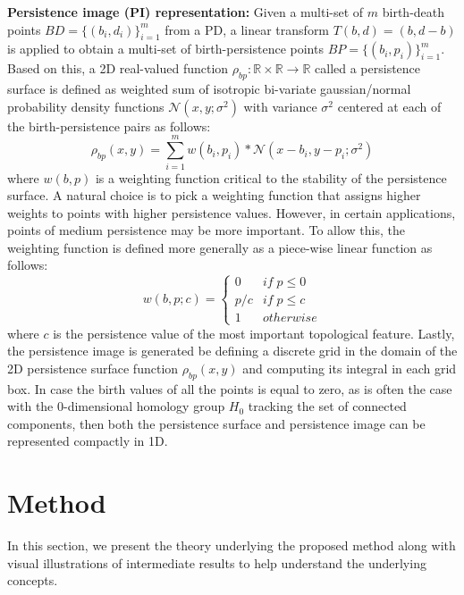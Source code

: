 \documentclass{article}
\begin{document}
\smallskip
\noindent \textbf{Persistence image (PI) representation:} Given a multi-set of $m$ birth-death points $BD=\{(b_i, d_i)\}_{i=1}^{m}$ from a PD, a linear transform $T(b, d) = (b, d-b)$ is applied to obtain a multi-set of birth-persistence points $BP=\{(b_i, p_i)\}_{i=1}^{m}$. Based on this, a 2D real-valued function $\rho_{bp} : \mathbb{R} \times \mathbb{R} \to \mathbb{R}$ called a persistence surface is defined as weighted sum of isotropic bi-variate gaussian/normal probability density functions $\mathcal{N}\left(x, y; \sigma^2\right)$ with variance $\sigma^2$ centered at each of the birth-persistence pairs as follows:
\begin{equation}
\rho_{bp}(x, y) = \sum_{i=1}^{m} w(b_i,p_i) * \mathcal{N}\left(x - b_i, y - p_i; \sigma^{2}\right)
\end{equation}
where $w(b, p)$ is a weighting function critical to the stability of the persistence surface. A natural choice is to pick a weighting function that assigns higher weights to points with higher persistence values. However, in certain applications, points of medium persistence may be more important. To allow this, the weighting function is defined more generally as a piece-wise linear function as follows:
\begin{equation}
w(b, p; c) = \left\{\begin{array}{ll}
 0 & if \; p \leq 0\\ 
 p / c & if \; p \leq c\\ 
 1 & otherwise
\end{array}\right.    
\end{equation}
where $c$ is the persistence value of the most important topological feature. Lastly, the persistence image is generated be defining a discrete grid in the domain of the 2D persistence surface function $\rho_{bp}(x, y)$ and computing its integral in each grid box. In case the birth values of all the points is equal to zero, as is often the case with the 0-dimensional homology group $H_0$ tracking the set of connected components, then both the persistence surface and persistence image can be represented compactly in 1D.  

\section{Method}
\label{sec:method}
In this section, we present the theory underlying the proposed method along with visual illustrations of intermediate results to help understand the underlying concepts. 
\end{document}
